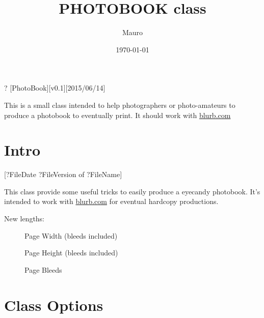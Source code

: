 \documentclass[article(a4paper)]{codedoc}
\title{PHOTOBOOK class}
\author{Mauro}
\date{\today}
\def\cmdcolor{red}
\newcommand{\pbitem}[1]{\item[\color{\cmdcolor}\Q{#1}]}
\begin{document}
\CodeEscape?
[PhotoBook][v0.1][2015/06/14]

\maketitle

This is a small class intended to help photographers or photo-amateurs to
produce a photobook to eventually print.
It should work with \url{blurb.com}

\tableofcontents

\section{Intro}
\label{sec:intro}

\begin{invisible}
[?FileDate ?FileVersion of ?FileName]

\end{invisible}

This class provide some useful tricks to easily produce a eyecandy photobook.
It's intended to work with \url{blurb.com} for eventual hardcopy productions.

\begin{invisible}
\newlength{\pbookwidth}
\newlength{\pbookheight}
\newlength{\pbookbleeds}
\setlength{\pbookbleeds}{0.125in}

\end{invisible}

New lengths:
\begin{description}
  \pbitem{\\pbookwidth} Page Width (bleeds included)
  \pbitem{\\pbookheight} Page Height (bleeds included)
  \pbitem{\\pbookbleeds} Page Bleeds
\end{description}


\begin{invisible}
\RequirePackage[cmyk]{xcolor}
\RequirePackage{everypage}

\end{invisible}

\section{Class Options}
\end{document}
